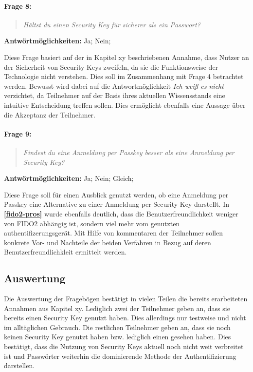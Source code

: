 \paragraph{Frage 8:}

\begin{quote}
    \textit{Hältst du einen Security Key für sicherer als ein Passwort?}
\end{quote}

\textbf{Antwörtmöglichkeiten:} Ja; Nein;

Diese Frage basiert auf der in Kapitel xy beschriebenen Annahme, dass Nutzer an der Sicherheit von Security Keys zweifeln, da sie die Funktionsweise der Technologie nicht verstehen. Dies soll im Zusammenhang mit Frage 4 betrachtet werden. Bewusst wird dabei auf die Antwortmöglichkeit \textit{Ich weiß es nicht} verzichtet, da Teilnehmer auf der Basis ihres aktuellen Wissensstands eine intuitive Entscheidung treffen sollen. Dies ermöglicht ebenfalls eine Aussage über die Akzeptanz der Teilnehmer. 

\paragraph{Frage 9:}

\begin{quote}
    \textit{Findest du eine Anmeldung per Passkey besser als eine Anmeldung per Security Key?}
\end{quote}

\textbf{Antwörtmöglichkeiten:} Ja; Nein; Gleich;

Diese Frage soll für einen Ausblick genutzt werden, ob eine Anmeldung per Passkey eine Alternative zu einer Anmeldung per Security Key darstellt. In \textbf{\ref{fido2-pros}} wurde ebenfalls deutlich, dass die Benutzerfreundlichkeit weniger von \ac{FIDO}2 abhängig ist, sondern viel mehr vom genutzten authentifizerungsgerät.  Mit Hilfe von kommentaren der Teilnehmer sollen konkrete Vor- und Nachteile der beiden Verfahren in Bezug auf deren Benutzerfreundlichkleit ermittelt werden.


\subsection{Auswertung}
Die Auswertung der Fragebögen bestätigt in vielen Teilen die bereits erarbeiteten Annahmen aus Kapitel xy. Lediglich zwei der Teilnehmer geben an, dass sie bereits einen Security Key genutzt haben. Dies allerdings nur testweise und nicht im alltäglichen Gebrauch. Die restlichen Teilnehmer geben an, dass sie noch keinen Security Key genutzt haben bzw. lediglich einen gesehen haben. Dies bestätigt, dass die Nutzung von Security Keys aktuell noch nicht weit verbreitet ist und Passwörter weiterhin die dominierende Methode der Authentifizierung darstellen.

